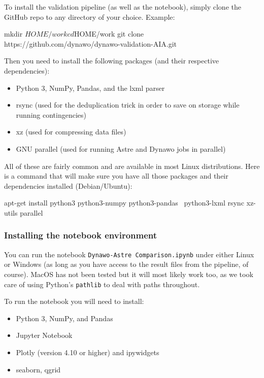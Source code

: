 \documentclass[11pt, a4paper, twoside, titlepage]{article}
\newcommand{\code}[1]{\texttt{#1}}
\begin{document}
To install the validation pipeline (as well as the notebook), simply
clone the GitHub repo to any directory of your choice. Example:
\begin{console}
mkdir $HOME/work
cd $HOME/work
git clone https://github.com/dynawo/dynawo-validation-AIA.git
\end{console}

Then you need to install the following packages (and their respective
dependencies):
\begin{itemize}
\item Python 3, NumPy, Pandas, and the lxml parser
\item rsync (used for the deduplication trick in order to save on
  storage while running contingencies)
\item xz (used for compressing data files)
\item GNU parallel (used for running Astre and Dynawo jobs in parallel) 
\end{itemize}

All of these are fairly common and are available in most Linux
distributions. Here is a command that will make sure you have all
those packages and their dependencies installed (Debian/Ubuntu):
\begin{console}
  apt-get install python3 python3-numpy python3-pandas \
                  python3-lxml rsync xz-utils parallel
\end{console}



\subsubsection*{Installing the notebook environment}

You can run the notebook \code{Dynawo-Astre Comparison.ipynb} under
either Linux or Windows (as long as you have access to the result
files from the pipeline, of course). MacOS has not been tested but it
will most likely work too, as we took care of using Python's
\code{pathlib} to deal with paths throughout.

To run the notebook you will need to install:
\begin{itemize}
\item Python 3, NumPy, and Pandas
\item Jupyter Notebook
\item Plotly (version 4.10 or higher) and ipywidgets
\item seaborn, qgrid
\end{itemize}
\end{document}
